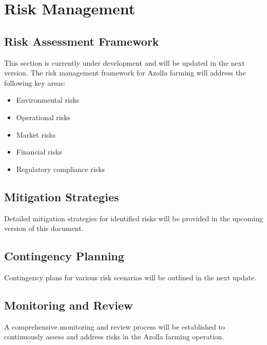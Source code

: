 \section{Risk Management}

\subsection{Risk Assessment Framework}

This section is currently under development and will be updated in the next version. The risk management framework for Azolla farming will address the following key areas:

\begin{itemize}
    \item Environmental risks
    \item Operational risks
    \item Market risks
    \item Financial risks
    \item Regulatory compliance risks
\end{itemize}

\subsection{Mitigation Strategies}

Detailed mitigation strategies for identified risks will be provided in the upcoming version of this document.

\subsection{Contingency Planning}

Contingency plans for various risk scenarios will be outlined in the next update.

\subsection{Monitoring and Review}

A comprehensive monitoring and review process will be established to continuously assess and address risks in the Azolla farming operation.
